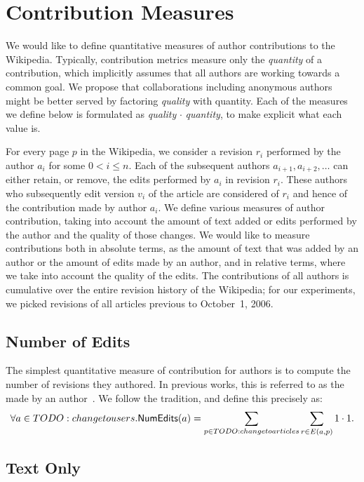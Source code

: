 \section{Contribution Measures}

We would like to define quantitative measures of author 
contributions to the Wikipedia.
Typically, contribution metrics measure only the
\textit{quantity} of a contribution,
which implicitly assumes that all authors
are working towards a common goal.
We propose that collaborations including anonymous
authors might be better served by factoring
\textit{quality} with quantity.
Each of the measures we define below
is formulated as
\textit{quality} $\cdot$ \textit{quantity},
to make explicit what each value is.

For every page $p$ in the Wikipedia, we consider a revision $r_i$ 
performed by the author $a_i$ for some $0 < i \le n$.
Each of the subsequent authors $a_{i+1},a_{i+2},\ldots$ can either
retain, or remove, the edits performed by $a_i$ in revision
$r_i$.
These authors who subsequently edit version $v_i$ of the article
are considered  of $r_i$ and hence of the 
contribution made by author $a_i$.
We define various measures of author contribution, taking into
account the amount of text added or edits performed by the author
and the quality of those changes.
We would like to measure contributions both in absolute terms,
as the amount of text that was added by an author or the
amount of edits made by an author, and in relative terms, 
where we take into account the quality of the edits.
The contributions of all authors is cumulative over the 
entire revision history of the Wikipedia;
for our experiments, we picked revisions of all articles
previous to October~1, 2006.

\subsection{Number of Edits}

\noindent
The simplest quantitative measure of contribution for 
authors is to compute the number of revisions they authored.
In previous works, this is referred to as the 
 made by an 
author~\cite{Wales2005,EditsEqQuality2007,Bourgeoisie2007,SteinHess2007}.
We follow the tradition, and define this precisely as:
%
\[
\forall a \in TODO: change to users .
\mathsf{NumEdits}(a) = \sum_{p \in TODO: change to articles} \sum_{r \in E(a, p)} 1 \cdot 1.
\]
%

\subsection{Text Only}

